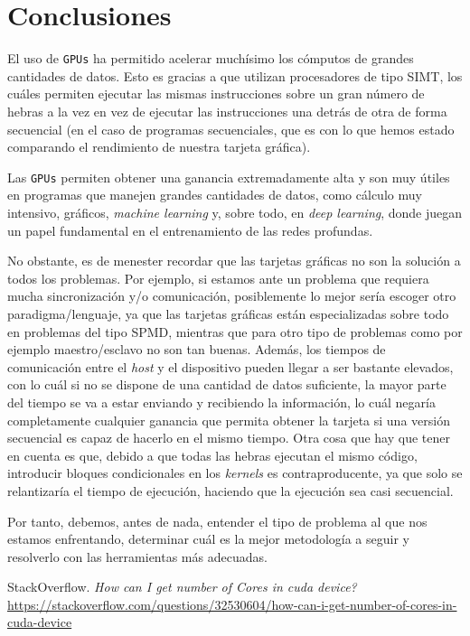 \documentclass[11pt,a4paper]{article}
\begin{document}
\section{Conclusiones}

El uso de \texttt{GPUs} ha permitido acelerar muchísimo los cómputos de grandes cantidades
de datos. Esto es gracias a que utilizan procesadores de tipo SIMT, los cuáles permiten
ejecutar las mismas instrucciones sobre un gran número de hebras a la vez en vez de ejecutar las
instrucciones una detrás de otra de forma secuencial (en el caso de programas secuenciales,
que es con lo que hemos estado comparando el rendimiento de nuestra tarjeta gráfica).

Las \texttt{GPUs} permiten obtener una ganancia extremadamente alta y son muy útiles en
programas que manejen grandes cantidades de datos, como cálculo muy intensivo, gráficos,
\textit{machine learning} y, sobre todo, en \textit{deep learning}, donde juegan un papel
fundamental en el entrenamiento de las redes profundas.

No obstante, es de menester recordar que las tarjetas gráficas no son la solución a todos
los problemas. Por ejemplo, si estamos ante un problema que requiera mucha sincronización
y/o comunicación, posiblemente lo mejor sería escoger otro paradigma/lenguaje, ya que
las tarjetas gráficas están especializadas sobre todo en problemas del tipo SPMD, mientras que
para otro tipo de problemas como por ejemplo maestro/esclavo no son tan buenas. Además, los
tiempos de comunicación entre el \textit{host} y el dispositivo pueden llegar a ser bastante
elevados, con lo cuál si no se dispone de una cantidad de datos suficiente, la mayor parte del
tiempo se va a estar enviando y recibiendo la información, lo cuál negaría completamente
cualquier ganancia que permita obtener la tarjeta si una versión secuencial es capaz de
hacerlo en el mismo tiempo. Otra cosa que hay que tener en cuenta es que, debido a que todas
las hebras ejecutan el mismo código, introducir bloques condicionales en los \textit{kernels}
es contraproducente, ya que solo se relantizaría el tiempo de ejecución, haciendo que la
ejecución sea casi secuencial.

Por tanto, debemos, antes de nada, entender el tipo de problema al que nos estamos enfrentando,
determinar cuál es la mejor metodología a seguir y resolverlo con las herramientas más adecuadas.


\newpage

\begin{thebibliography}{5}

StackOverflow. \textit{How can I get number of Cores in cuda device?}
\\\url{https://stackoverflow.com/questions/32530604/how-can-i-get-number-of-cores-in-cuda-device}

\end{thebibliography}
\end{document}
